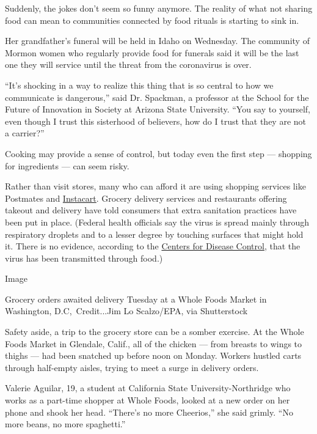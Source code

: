 Suddenly, the jokes don't seem so funny anymore. The reality of what not
sharing food can mean to communities connected by food rituals is
starting to sink in.

Her grandfather's funeral will be held in Idaho on Wednesday. The
community of Mormon women who regularly provide food for funerals said
it will be the last one they will service until the threat from the
coronavirus is over.

``It's shocking in a way to realize this thing that is so central to how
we communicate is dangerous,'' said Dr. Spackman, a professor at the
School for the Future of Innovation in Society at Arizona State
University. ``You say to yourself, even though I trust this sisterhood
of believers, how do I trust that they are not a carrier?''

Cooking may provide a sense of control, but today even the first step
--- shopping for ingredients --- can seem risky.

Rather than visit stores, many who can afford it are using shopping
services like Postmates and
\href{https://www.nytimes3xbfgragh.onion/2019/02/06/technology/instacart-doordash-tipping-deliveries.html}{Instacart}.
Grocery delivery services and restaurants offering takeout and delivery
have told consumers that extra sanitation practices have been put in
place. (Federal health officials say the virus is spread mainly through
respiratory droplets and to a lesser degree by touching surfaces that
might hold it. There is no evidence, according to the
\href{https://www.cdc.gov/coronavirus/2019-ncov/faq.html}{Centers for
Disease Control}, that the virus has been transmitted through food.)

Image

Grocery orders awaited delivery Tuesday at a Whole Foods Market in
Washington, D.C,~Credit...Jim Lo Scalzo/EPA, via Shutterstock

Safety aside, a trip to the grocery store can be a somber exercise. At
the Whole Foods Market in Glendale, Calif., all of the chicken --- from
breasts to wings to thighs --- had been snatched up before noon on
Monday. Workers hustled carts through half-empty aisles, trying to meet
a surge in delivery orders.

Valerie Aguilar, 19, a student at California State University-Northridge
who works as a part-time shopper at Whole Foods, looked at a new order
on her phone and shook her head. ``There's no more Cheerios,'' she said
grimly. ``No more beans, no more spaghetti.''

